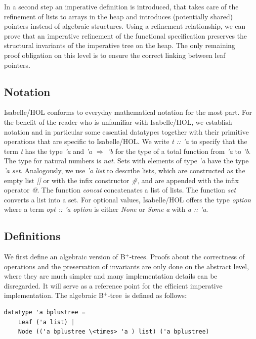 \documentclass[a4paper,UKenglish,cleveref, autoref, thm-restate]{lipics-v2021}
\newcommand{\btree}{B$^+$-tree}
\newcommand{\btrees}{B$^+$-trees}
\begin{document}
In a second step an imperative definition is introduced,
that takes care of the refinement of lists to arrays in the heap
and introduces (potentially shared) pointers instead of algebraic structures.
Using a refinement relationship, we can prove that an imperative refinement
of the functional specification preserves the structural invariants
of the imperative tree on the heap.
The only remaining proof obligation on this level is to ensure the correct linking
between leaf pointers.

\subsection{Notation}

Isabelle/HOL conforms to everyday mathematical notation for the most part.
For the benefit of the reader who is unfamiliar with Isabelle/HOL, we establish
notation and in particular some essential datatypes together with their primitive
operations that are specific to Isabelle/HOL. We write \textit{t :: 'a} to specify that
the term \textit{t} has the type \textit{'a} and \textit{'a $\Rightarrow$ 'b}
for the type of a total function from \textit{'a} to \textit{'b}.
The type for natural numbers is \textit{nat}.
Sets with elements of type \textit{'a} have the type \textit{'a set}.
Analogously, we use \textit{'a list} to describe lists, which are constructed as the empty
list \textit{[]} or with the infix constructor \textit{\#}, and are appended with the infix operator
\textit{@}. The function \textit{concat} concatenates a list of lists.
The function \textit{set} converts a list into a set. For optional values, Isabelle/HOL
offers the type \textit{option} where a term \textit{opt :: 'a option} is either \textit{None} or \textit{Some a}
with \textit{a :: 'a}.

\subsection{Definitions}
\label{sec:data_structure_defs}


We first define an algebraic version of \btrees.
Proofs about the correctness of operations and the preservation of invariants
are only done on the abstract level, where they are much simpler
and many implementation details can be disregarded.
It will serve as a reference point for the efficient
imperative implementation.
The algebraic \btree\ is defined as follows:

\begin{lstlisting}[mathescape=true, language=Isabelle,label=lst:btree-def]
datatype 'a bplustree =
    Leaf ('a list) |
    Node (('a bplustree \<times> 'a ) list) ('a bplustree)
\end{lstlisting}
\end{document}
